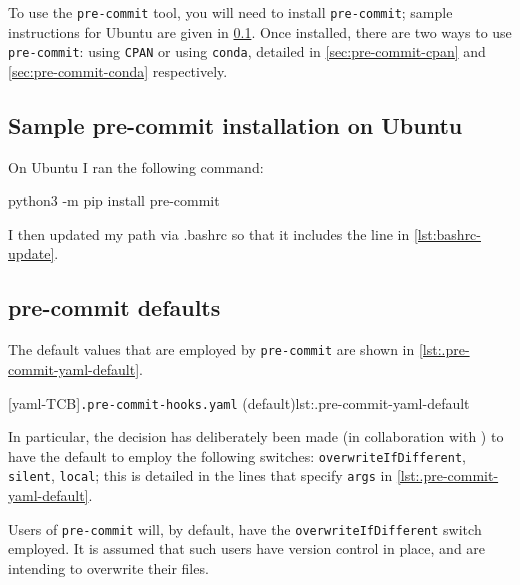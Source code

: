   To use the \texttt{pre-commit} tool, you will need to install \texttt{pre-commit};
  sample instructions for Ubuntu are given in \cref{sec:pre-commit-ubuntu}. Once
  installed, there are two ways to use \texttt{pre-commit}: using \texttt{CPAN} or using
  \texttt{conda}, detailed in \cref{sec:pre-commit-cpan} and \cref{sec:pre-commit-conda}
  respectively.

 \subsection{Sample pre-commit installation on Ubuntu}\label{sec:pre-commit-ubuntu}
  On Ubuntu I ran the following command:

  \begin{commandshell}
python3 -m pip install pre-commit
\end{commandshell}

  I then updated my path via .bashrc so that it includes the line in
  \cref{lst:bashrc-update}.

 \subsection{pre-commit defaults}
  The default values that are employed by \texttt{pre-commit} are shown in \cref{lst:.pre-commit-yaml-default}.

  [yaml-TCB]{\texttt{.pre-commit-hooks.yaml} (default)}{lst:.pre-commit-yaml-default}

  In particular, the decision has deliberately been made (in collaboration with
  \cite{holzhausprecommit}) to have the default to employ the following switches:
  \texttt{overwriteIfDifferent}, \texttt{silent}, \texttt{local}; this is detailed in the
  lines that specify \texttt{args} in \cref{lst:.pre-commit-yaml-default}.

  \begin{warning}
   Users of \texttt{pre-commit} will, by default, have the \texttt{overwriteIfDifferent}
   switch employed. It is assumed that such users have version control in place, and are
   intending to overwrite their files.
  \end{warning}

